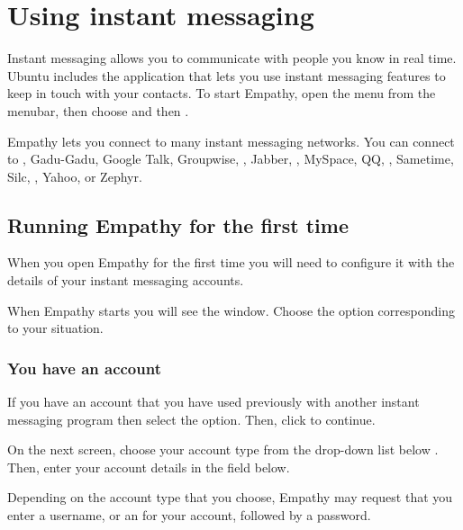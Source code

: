
\section{Using instant messaging}

Instant messaging allows you to communicate with people you know in real time. 
Ubuntu includes the  application that lets you use
instant messaging features to keep in touch with your contacts. 
To start Empathy, open the  menu from the menubar, then 
choose  and then . 

Empathy lets you connect to many instant messaging networks. You can connect
to , Gadu-Gadu, Google Talk, Groupwise, , 
Jabber, , MySpace, QQ, 
, Sametime, Silc, , Yahoo, or Zephyr.

\subsection{Running Empathy for the first time}

When you open Empathy for the first time you will need to configure it with 
the details of your instant messaging accounts. 

When Empathy starts you will see the  
window. Choose the option corresponding to your situation.

\subsubsection{You have an account}

If you have an account that you have used previously with another instant 
messaging program then select the  option. Then, click  to continue.

On the next screen, choose your account type from the drop-down list below
. Then, enter your account 
details in the field below. 

Depending on the account type that you choose, Empathy may request that you
enter a username, or an  for your account, followed by a password.


